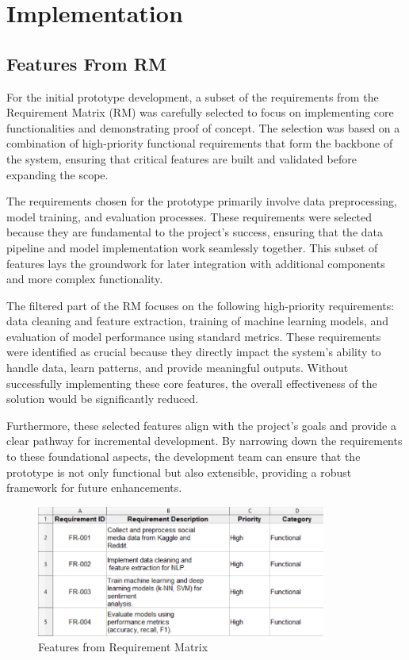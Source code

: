 
\section{Implementation}
\subsection{Features From RM}
\noindent
For the initial prototype development, a subset of the requirements from the Requirement Matrix (RM) was carefully selected to focus on implementing core functionalities and demonstrating proof of concept. The selection was based on a combination of high-priority functional requirements that form the backbone of the system, ensuring that critical features are built and validated before expanding the scope.

The requirements chosen for the prototype primarily involve data preprocessing, model training, and evaluation processes. These requirements were selected because they are fundamental to the project's success, ensuring that the data pipeline and model implementation work seamlessly together. This subset of features lays the groundwork for later integration with additional components and more complex functionality.

The filtered part of the RM focuses on the following high-priority requirements: data cleaning and feature extraction, training of machine learning models, and evaluation of model performance using standard metrics. These requirements were identified as crucial because they directly impact the system's ability to handle data, learn patterns, and provide meaningful outputs. Without successfully implementing these core features, the overall effectiveness of the solution would be significantly reduced.

Furthermore, these selected features align with the project’s goals and provide a clear pathway for incremental development. By narrowing down the requirements to these foundational aspects, the development team can ensure that the prototype is not only functional but also extensible, providing a robust framework for future enhancements.

\begin{figure}[h!]  
    \centering
    \includegraphics[width=0.85\textwidth]{Images/RM_part_for_implementation.png}  
    \caption{Features from Requirement Matrix}
    \label{Features from Requirement Matrix}  %
\end{figure}

